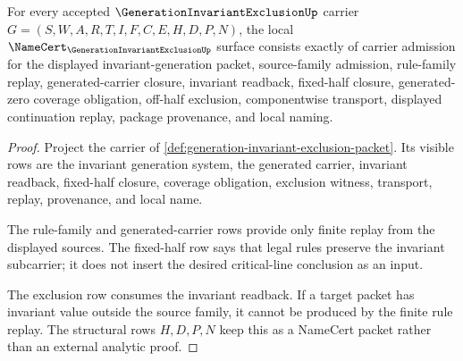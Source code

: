 \begin{theorem}
\label{thm:generation-invariant-exclusion-namecert-obligations}
For every accepted $\GenerationInvariantExclusionUp$ carrier $G=(S,W,A,R,T,I,F,C,E,H,D,P,N)$, the local $\NameCert_{\GenerationInvariantExclusionUp}$ surface consists exactly of carrier admission for the displayed invariant-generation packet, source-family admission, rule-family replay, generated-carrier closure, invariant readback, fixed-half closure, generated-zero coverage obligation, off-half exclusion, componentwise transport, displayed continuation replay, package provenance, and local naming.
\end{theorem}
\begin{proof}
Project the carrier of \autoref{def:generation-invariant-exclusion-packet}. Its visible rows are the invariant generation system, the generated carrier, invariant readback, fixed-half closure, coverage obligation, exclusion witness, transport, replay, provenance, and local name.

The rule-family and generated-carrier rows provide only finite replay from the displayed sources. The fixed-half row says that legal rules preserve the invariant subcarrier; it does not insert the desired critical-line conclusion as an input.

The exclusion row consumes the invariant readback. If a target packet has invariant value outside the source family, it cannot be produced by the finite rule replay. The structural rows $H,D,P,N$ keep this as a NameCert packet rather than an external analytic proof.
\end{proof}

